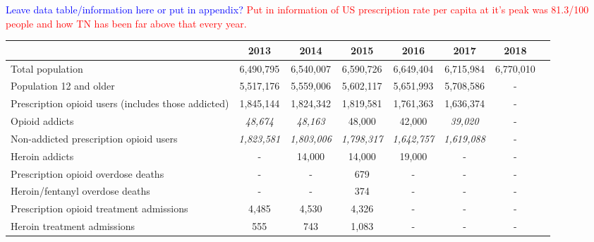 \documentclass[12pt]{article}
\begin{document}
\textcolor{blue}{Leave data table/information here or put in appendix?}
\textcolor{red}{Put in information of US prescription rate per capita at it's peak was 81.3/100 people and how TN has been far above that every year.}
\begin{tabular}{|l|c|c|c|c|c|c|l}
\hline
 & \footnotesize{2013} & \footnotesize{2014} & \footnotesize{2015} & \footnotesize{2016} & \footnotesize{2017} & \footnotesize{2018}\\
\hline
\footnotesize
Total population & \footnotesize{6,490,795} & \footnotesize{6,540,007} & \footnotesize{6,590,726} & \footnotesize{6,649,404} & \footnotesize{6,715,984} & \footnotesize{6,770,010}\\
\footnotesize
Population 12 and older & \footnotesize{5,517,176} & \footnotesize{5,559,006} & \footnotesize{5,602,117} & \footnotesize{5,651,993} & \footnotesize{5,708,586} & -\\
\footnotesize
Prescription opioid users (includes those addicted) & \footnotesize{1,845,144} &\footnotesize{1,824,342} & \footnotesize{1,819,581} & \footnotesize{1,761,363} &  \footnotesize{1,636,374} &-\\
\footnotesize
Opioid addicts & \footnotesize{\textit{48,674}} & \footnotesize{\textit{48,163}} & \footnotesize{48,000
} & \footnotesize{42,000} & \footnotesize{\textit{39,020}} &-\\
\footnotesize
Non-addicted prescription opioid users   & \footnotesize{\textit{1,823,581}} &\footnotesize{\textit{1,803,006
}} & \footnotesize{\textit{1,798,317}} & \footnotesize{\textit{1,642,757}} &  \footnotesize{\textit{1,619,088
}} &-\\
\footnotesize
Heroin addicts & - &\footnotesize{14,000} & \footnotesize{14,000} & \footnotesize{19,000}  & - &-\\
\footnotesize
Prescription opioid overdose deaths & - & - & \footnotesize{679} & -  & - &-\\
\footnotesize
Heroin/fentanyl overdose deaths & - & - & \footnotesize{374} & -  & - &-\\
\footnotesize
Prescription opioid treatment admissions & \footnotesize{4,485} & \footnotesize{4,530} & \footnotesize{4,326} & -  & - &-\\
\footnotesize
Heroin treatment admissions & \footnotesize{555} & \footnotesize{743} & \footnotesize{1,083} & -  & - &-\\
\hline
\end{tabular} \\
\label{tab:template}
\end{document}

